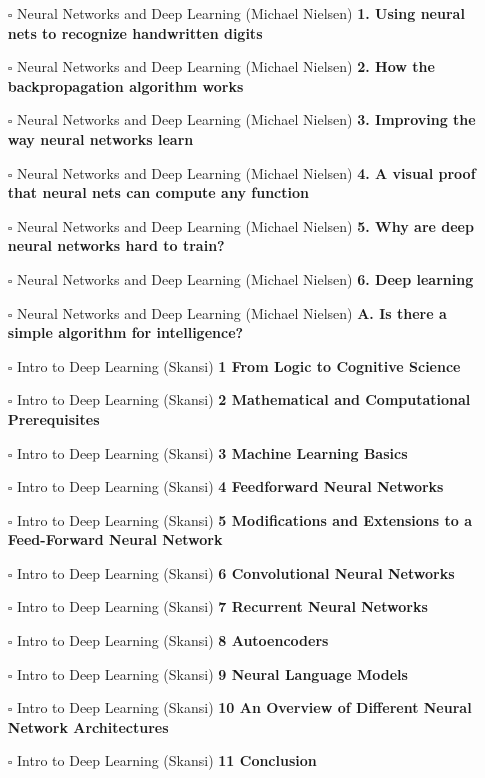 \documentclass[a4, landscape, 12pt]{article}
\newcommand{\checkbox}{$\square$}%
\begin{document}
\begin{itemize}
{}
\item [\checkbox]  Neural Networks and Deep Learning (Michael Nielsen) \textbf{ 1. Using neural nets to recognize handwritten digits
}
\item [\checkbox]  Neural Networks and Deep Learning (Michael Nielsen) \textbf{ 2. How the backpropagation algorithm works
}
\item [\checkbox]  Neural Networks and Deep Learning (Michael Nielsen) \textbf{ 3. Improving the way neural networks learn
}
\item [\checkbox]  Neural Networks and Deep Learning (Michael Nielsen) \textbf{ 4. A visual proof that neural nets can compute any function
}
\item [\checkbox]  Neural Networks and Deep Learning (Michael Nielsen) \textbf{ 5. Why are deep neural networks hard to train?
}
\item [\checkbox]  Neural Networks and Deep Learning (Michael Nielsen) \textbf{ 6. Deep learning
}
\item [\checkbox]  Neural Networks and Deep Learning (Michael Nielsen) \textbf{ A. Is there a simple algorithm for intelligence?
}
\item [\checkbox]  Intro to Deep Learning (Skansi) \textbf{ 1 From Logic to Cognitive Science
}
\item [\checkbox]  Intro to Deep Learning (Skansi) \textbf{ 2 Mathematical and Computational Prerequisites
}
\item [\checkbox]  Intro to Deep Learning (Skansi) \textbf{ 3 Machine Learning Basics
}
\item [\checkbox]  Intro to Deep Learning (Skansi) \textbf{ 4 Feedforward Neural Networks
}
\item [\checkbox]  Intro to Deep Learning (Skansi) \textbf{ 5 Modifications and Extensions to a Feed-Forward Neural Network
}
\item [\checkbox]  Intro to Deep Learning (Skansi) \textbf{ 6 Convolutional Neural Networks
}
\item [\checkbox]  Intro to Deep Learning (Skansi) \textbf{ 7 Recurrent Neural Networks
}
\item [\checkbox]  Intro to Deep Learning (Skansi) \textbf{ 8 Autoencoders
}
\item [\checkbox]  Intro to Deep Learning (Skansi) \textbf{ 9 Neural Language Models
}
\item [\checkbox]  Intro to Deep Learning (Skansi) \textbf{ 10 An Overview of Different Neural Network Architectures
}
\item [\checkbox]  Intro to Deep Learning (Skansi) \textbf{ 11 Conclusion
}
\end{itemize}
\end{document}
